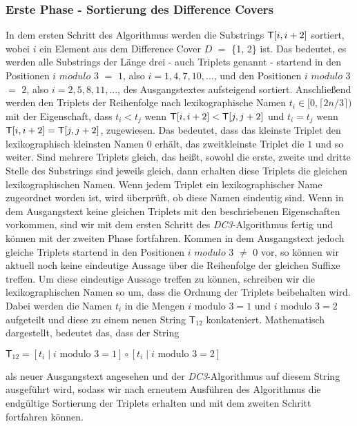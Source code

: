 \subsubsection{Erste Phase - Sortierung des Difference Covers}
\label{dc3:algorithmus:phase1}

In dem ersten Schritt des Algorithmus werden die Substrings $\inputtext[i, i+2]$ sortiert, wobei $i$ ein Element aus dem Difference Cover \(D\) $=$ \{1, 2\} ist. Das bedeutet, es werden alle Substrings der Länge drei - auch Triplets genannt - startend in den Positionen \(i\) \(modulo\) \(3\) $=$ \(1\), also $i = 1, 4, 7, 10,...$, und den Positionen \(i\) \(modulo\) \(3\) $=$ \(2\), also $i = 2, 5, 8, 11,...$, des Ausgangstextes  aufsteigend sortiert.
Anschließend werden den Triplets der Reihenfolge nach lexikographische Namen $t_i \in [0,\lceil2n/3\rceil)$ mit der Eigenschaft, dass $t_i < t_j$ wenn $\inputtext[i, i+2] < \inputtext[j, j+2]$ und $t_i = t_j$ wenn $\inputtext[i, i+2] = \inputtext[j, j+2]$, zugewiesen. Das bedeutet, dass das kleinste Triplet den lexikographisch kleinsten Namen $0$ erhält, das zweitkleinste Triplet die $1$ und so weiter. Sind mehrere Triplets gleich, das heißt, sowohl die erste, zweite und dritte Stelle des Substrings sind jeweils gleich, dann erhalten diese Triplets die gleichen lexikographischen Namen.
Wenn jedem Triplet ein lexikographischer Name zugeordnet worden ist, wird überprüft, ob diese Namen eindeutig sind. Wenn in dem Ausgangstext keine gleichen Triplets mit den beschriebenen Eigenschaften vorkommen, sind wir mit dem ersten Schritt des \emph{DC3}-Algorithmus fertig und können mit der zweiten Phase fortfahren. Kommen in dem Ausgangstext  jedoch gleiche Triplets startend in den Positionen \(i\) \(modulo\) \(3\) $\neq$ \(0\) vor, so können wir aktuell noch keine eindeutige Aussage über die Reihenfolge der gleichen Suffixe treffen. Um diese eindeutige Aussage treffen zu können, schreiben wir die lexikographischen Namen so um, dass die Ordnung der Triplets beibehalten wird. Dabei werden die Namen $t_i$ in die Mengen $i \text{ modulo } 3 = 1$ und $i \text{ modulo } 3 = 2$ aufgeteilt und diese zu einem neuen String $\mathsf{T}_{12}$ konkateniert. Mathematisch dargestellt, bedeutet das, dass der String
\begin{center}
	$\mathsf{T}_{12} = [t_i \mid i \text{ modulo } 3 = 1] \circ [t_i \mid i \text{ modulo } 3 = 2]$ 
\end{center}
als neuer Ausgangstext angesehen und der \emph{DC3}-Algorithmus auf diesem String ausgeführt wird, sodass wir nach erneutem Ausführen des Algorithmus die endgültige Sortierung der Triplets erhalten und mit dem zweiten Schritt fortfahren können.

